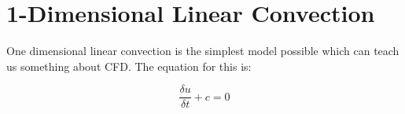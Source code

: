 \section{1-Dimensional Linear Convection}

One dimensional linear convection is the simplest model possible which can teach us something about CFD.
The equation for this is:

\begin{equation}
\frac{\delta{}u}{\delta{}t} + c = 0
\end{equation}

